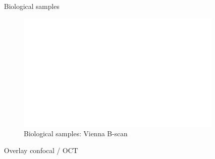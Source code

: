 Biological samples
\begin{figure}[h!]\centering \includegraphics[width=10cm,draft]{figures/foo.png}
      \caption{Biological samples: Vienna B-scan}
\end{figure}

Overlay confocal / OCT